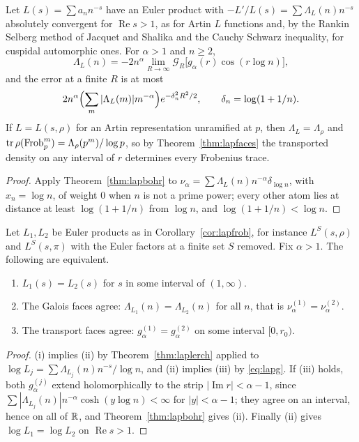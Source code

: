 \begin{corollary}\label{cor:lapfrob}
Let $L(s)=\sum a_nn^{-s}$ have an Euler product with $-L'/L(s)=\sum\Lambda_L(n)n^{-s}$ absolutely convergent for $\operatorname{Re}s>1$, as for Artin $L$ functions and, by the Rankin Selberg method of Jacquet and Shalika \cite{jacquetshalika1981} and the Cauchy Schwarz inequality, for cuspidal automorphic ones. For $\alpha>1$ and $n\ge2$,
\[
\Lambda_L(n)=-2n^\alpha\lim_{R\to\infty}\mathcal G_R\bigl[g_\alpha(r)\cos(r\log n)\bigr],
\]
and the error at a finite $R$ is at most
\[
2n^\alpha\Bigl(\sum_m|\Lambda_L(m)|m^{-\alpha}\Bigr)e^{-\delta_n^2R^2/2},\qquad\delta_n=\log(1+1/n).
\]
If $L=L(s,\rho)$ for an Artin representation unramified at $p$, then $\Lambda_L=\Lambda_\rho$ and $\operatorname{tr}\rho(\operatorname{Frob}_p^m)=\Lambda_\rho(p^m)/\log p$, so by Theorem~\ref{thm:lapfaces} the transported density on any interval of $r$ determines every Frobenius trace.
\end{corollary}

\begin{proof}
Apply Theorem~\ref{thm:lapbohr} to $\nu_\alpha=\sum\Lambda_L(n)n^{-\alpha}\delta_{\log n}$, with $x_n=\log n$, of weight $0$ when $n$ is not a prime power; every other atom lies at distance at least $\log(1+1/n)$ from $\log n$, and $\log(1+1/n)<\log n$.
\end{proof}

\begin{theorem}\label{thm:lapfaces}
Let $L_1,L_2$ be Euler products as in Corollary~\ref{cor:lapfrob}, for instance $L^S(s,\rho)$ and $L^S(s,\pi)$ with the Euler factors at a finite set $S$ removed. Fix $\alpha>1$. The following are equivalent.
\begin{enumerate}
\item[(i)] $L_1(s)=L_2(s)$ for $s$ in some interval of $(1,\infty)$.
\item[(ii)] The Galois faces agree: $\Lambda_{L_1}(n)=\Lambda_{L_2}(n)$ for all $n$, that is $\nu^{(1)}_\alpha=\nu^{(2)}_\alpha$.
\item[(iii)] The transport faces agree: $g^{(1)}_\alpha=g^{(2)}_\alpha$ on some interval $[0,r_0)$.
\end{enumerate}
\end{theorem}

\begin{proof}
(i) implies (ii) by Theorem~\ref{thm:laplerch} applied to $\log L_j=\sum\Lambda_{L_j}(n)n^{-s}/\log n$, and (ii) implies (iii) by \eqref{eq:lapg}. If (iii) holds, both $g^{(j)}_\alpha$ extend holomorphically to the strip $|\operatorname{Im}r|<\alpha-1$, since $\sum|\Lambda_{L_j}(n)|n^{-\alpha}\cosh(y\log n)<\infty$ for $|y|<\alpha-1$; they agree on an interval, hence on all of $\mathbb{R}$, and Theorem~\ref{thm:lapbohr} gives (ii). Finally (ii) gives $\log L_1=\log L_2$ on $\operatorname{Re}s>1$.
\end{proof}

